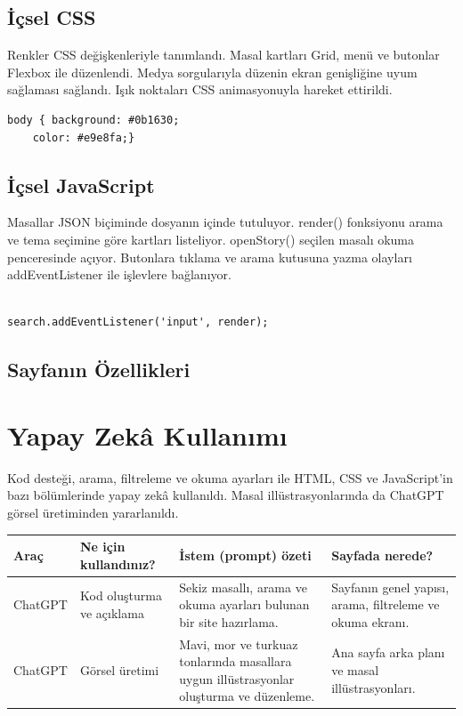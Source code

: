 \documentclass[12pt,a4paper]{article}
\begin{document}
\subsection{İçsel CSS}
Renkler CSS değişkenleriyle tanımlandı. Masal kartları
Grid, menü ve butonlar Flexbox ile düzenlendi.
Medya sorgularıyla düzenin ekran genişliğine uyum
sağlaması sağlandı. Işık noktaları CSS animasyonuyla
hareket ettirildi.

\begin{lstlisting}[caption={İçsel CSS örneği}]
body { background: #0b1630;
    color: #e9e8fa;}
\end{lstlisting}

\subsection{İçsel JavaScript}
Masallar JSON biçiminde dosyanın içinde tutuluyor.
render() fonksiyonu arama ve tema seçimine göre kartları
listeliyor. openStory() seçilen masalı okuma penceresinde
açıyor. Butonlara tıklama ve arama kutusuna yazma olayları
addEventListener ile işlevlere bağlanıyor.

\begin{lstlisting}[caption={İçsel JavaScript'ten önemli bir bölüm}]

search.addEventListener('input', render);
\end{lstlisting}



\newpage


\subsection{Sayfanın Özellikleri}

\section{Yapay Zekâ Kullanımı}
Kod desteği, arama, filtreleme ve okuma ayarları ile HTML, CSS ve JavaScript'in bazı bölümlerinde yapay zekâ kullanıldı. Masal illüstrasyonlarında da ChatGPT görsel üretiminden yararlanıldı.

\begin{longtable}{@{}P{2.4cm}P{3.4cm}P{4.1cm}P{3.4cm}@{}}
\toprule
\textbf{Araç} & \textbf{Ne için kullandınız?} & \textbf{İstem (prompt) özeti} & \textbf{Sayfada nerede?} \\
\midrule
\endhead
ChatGPT & Kod oluşturma ve açıklama & Sekiz masallı, arama ve okuma ayarları bulunan bir site hazırlama. & Sayfanın genel yapısı, arama, filtreleme ve okuma ekranı. \\
ChatGPT & Görsel üretimi & Mavi, mor ve turkuaz tonlarında masallara uygun illüstrasyonlar oluşturma ve düzenleme. & Ana sayfa arka planı ve masal illüstrasyonları. \\
\bottomrule
\end{longtable}
\end{document}
